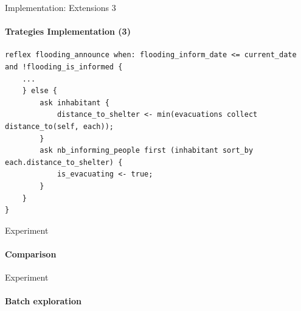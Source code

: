 \documentclass{beamer}
\begin{document}
\begin{frame}[fragile]{Implementation: Extensions 3}
\framesubtitle{Trategies Implementation (3)}
    
\begin{lstlisting}[style=GAML]
reflex flooding_announce when: flooding_inform_date <= current_date and !flooding_is_informed {		
    ...
    } else {
        ask inhabitant {
            distance_to_shelter <- min(evacuations collect distance_to(self, each));
        }
        ask nb_informing_people first (inhabitant sort_by each.distance_to_shelter) {
            is_evacuating <- true;
        }
    }
} 
\end{lstlisting}

\end{frame}

\begin{frame}[fragile]{Experiment}
\framesubtitle{Comparison}


\end{frame}

\begin{frame}[fragile]{Experiment}
\framesubtitle{Batch exploration}


\end{frame}

\backmatter
\end{document}
